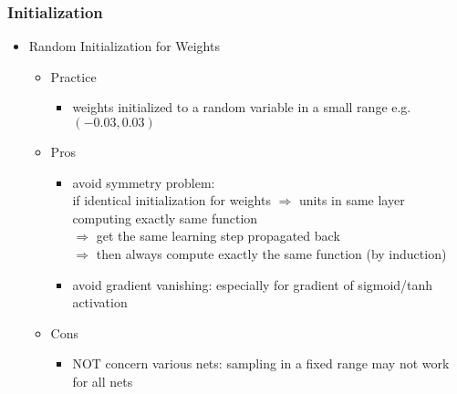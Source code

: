 \subsubsection{Initialization}
\begin{itemize}
\item Random Initialization for Weights
	\begin{itemize}
	\item Practice
		\begin{itemize}
		\item weights initialized to a random variable in a small range e.g. $(-0.03, 0.03)$
		\end{itemize}
	\item Pros
		\begin{itemize}
		\item avoid symmetry problem: \\
		if identical initialization for weights $\Rightarrow$ units in same layer computing exactly same function \\
		$\Rightarrow$ get the same learning step propagated back \\
		$\Rightarrow$ then always compute exactly the same function (by induction)
		\item avoid gradient vanishing: especially for gradient of sigmoid/tanh activation
		\end{itemize}
	\item Cons
		\begin{itemize}
		\item NOT concern various nets: sampling in a fixed range may not work for all nets
		\end{itemize}
	\end{itemize}


\end{itemize}
